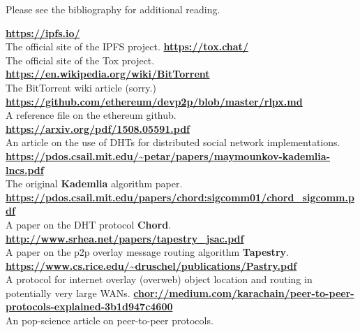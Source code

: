 \documentclass[12pt]{article}
\begin{document}
    Please see the bibliography for additional reading.
	
	\begin{thebibliography}{8}
            \textbf{\url{https://ipfs.io/}}\\
            The official site of the IPFS project.
            \textbf{\url{https://tox.chat/}}\\
            The official site of the Tox project.
            \textbf{\url{https://en.wikipedia.org/wiki/BitTorrent}}\\
            The BitTorrent wiki article (sorry.)
            \textbf{\url{https://github.com/ethereum/devp2p/blob/master/rlpx.md}}\\
            A reference file on the ethereum github.
            \textbf{\url{https://arxiv.org/pdf/1508.05591.pdf}}\\
            An article on the use of DHTs for distributed social network
            implementations.
		    \textbf{\url{https://pdos.csail.mit.edu/~petar/papers/maymounkov-kademlia-lncs.pdf}}\\
            The original \textbf{Kademlia} algorithm paper.
	    	\textbf{\url{https://pdos.csail.mit.edu/papers/chord:sigcomm01/chord_sigcomm.pdf}}\\
            A paper on the DHT protocol \textbf{Chord}.
	    	\textbf{\url{http://www.srhea.net/papers/tapestry_jsac.pdf}}\\
            A paper on the p2p overlay message routing algorithm \textbf{Tapestry}.
	    	\textbf{\url{https://www.cs.rice.edu/~druschel/publications/Pastry.pdf}}\\
            A protocol for internet overlay (overweb) object location and
            routing in potentially very large WANs.
	    	\textbf{\url{chor://medium.com/karachain/peer-to-peer-protocols-explained-3b1d947c4600}}\\
            An pop-science article on peer-to-peer protocols.
	\end{thebibliography}
\end{document}
